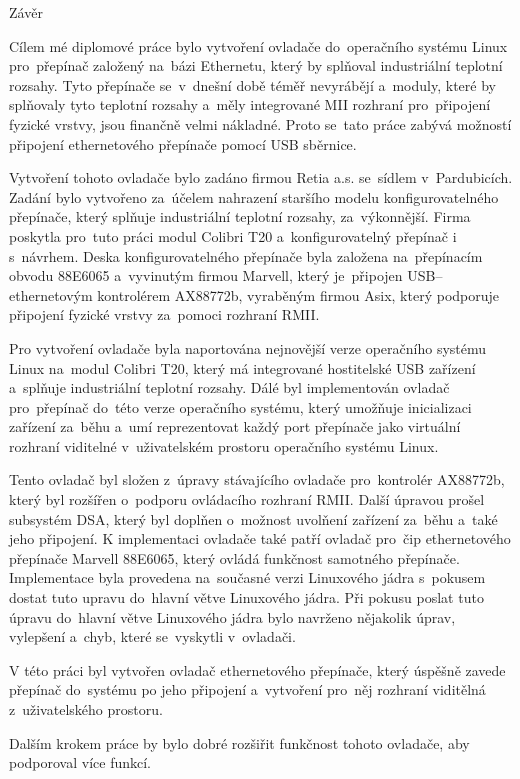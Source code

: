 
\chap Závěr

Cílem mé diplomové práce bylo vytvoření ovladače do~operačního systému Linux pro~přepínač založený na~bázi Ethernetu, který by splňoval industriální teplotní rozsahy.
Tyto přepínače se~v~dnešní době téměř nevyrábějí a~moduly, které by splňovaly tyto teplotní rozsahy a~měly integrované MII rozhraní pro~připojení fyzické vrstvy, jsou finančně velmi nákladné.
Proto se~tato práce zabývá možností připojení ethernetového přepínače pomocí USB sběrnice.

Vytvoření tohoto ovladače bylo zadáno firmou Retia a.s. se~sídlem v~Pardubicích.
Zadání bylo vytvořeno za~účelem nahrazení staršího modelu konfigurovatelného přepínače, který splňuje industriální teplotní rozsahy, za~výkonnější.
Firma poskytla pro~tuto práci modul Colibri T20 a~konfigurovatelný přepínač i s~návrhem.
Deska konfigurovatelného přepínače byla založena na~přepínacím obvodu 88E6065 a~vyvinutým firmou Marvell, který je~připojen USB--ethernetovým kontrolérem AX88772b, vyraběným firmou Asix, který podporuje připojení fyzické vrstvy za~pomoci rozhraní RMII.

Pro vytvoření ovladače byla naportována nejnovější verze operačního systému Linux na~modul Colibri T20, který má integrované hostitelské USB zařízení a~splňuje industriální teplotní rozsahy.
Dálé byl implementován ovladač pro~přepínač do~této verze operačního systému, který umožňuje inicializaci zařízení za~běhu a~umí reprezentovat každý port přepínače jako virtuální rozhraní viditelné v~uživatelském prostoru operačního systému Linux.

Tento ovladač byl složen z~úpravy stávajícího ovladače pro~kontrolér AX88772b, který byl rozšířen o~podporu ovládacího rozhraní RMII.
Další úpravou prošel subsystém DSA, který byl doplňen o~možnost uvolňení zařízení za~běhu a~také jeho připojení.
K implementaci ovladače také patří ovladač pro~čip ethernetového přepínače Marvell 88E6065, který ovládá funkčnost samotného přepínače.
Implementace byla provedena na~současné verzi Linuxového jádra s~pokusem dostat tuto upravu do~hlavní větve Linuxového jádra.
Při pokusu poslat tuto úpravu do~hlavní větve Linuxového jádra bylo navrženo nějakolik úprav, vylepšení a~chyb, které se~vyskytli v~ovladači.

V této práci byl vytvořen ovladač ethernetového přepínače, který úspěšně zavede přepínač do~systému po jeho připojení a~vytvoření pro~něj rozhraní viditělná z~uživatelského prostoru.

Dalším krokem práce by bylo dobré rozšiřit funkčnost tohoto ovladače, aby podporoval více funkcí.




